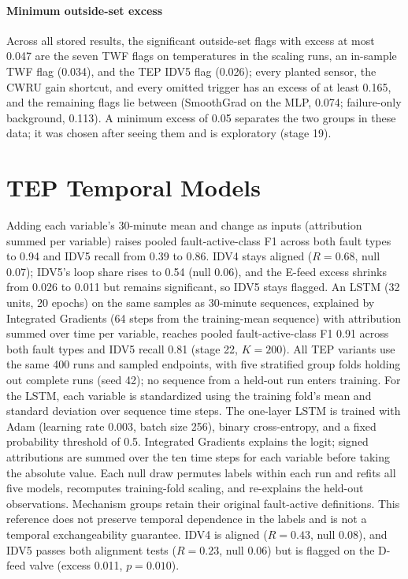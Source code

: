 \documentclass[10pt]{article}
\begin{document}
\paragraph{Minimum outside-set excess} Across all stored results, the significant outside-set flags with excess at most 0.047 are the seven TWF flags on temperatures in the scaling runs, an in-sample TWF flag (0.034), and the TEP IDV5 flag (0.026); every planted sensor, the CWRU gain shortcut, and every omitted trigger has an excess of at least 0.165, and the remaining flags lie between (SmoothGrad on the MLP, 0.074; failure-only background, 0.113). A minimum excess of 0.05 separates the two groups in these data; it was chosen after seeing them and is exploratory (stage 19).

\clearpage
\section{TEP Temporal Models} Adding each variable's 30-minute mean and change as inputs (attribution summed per variable) raises pooled fault-active-class F1 across both fault types to 0.94 and IDV5 recall from 0.39 to 0.86. IDV4 stays aligned ($R=0.68$, null 0.07); IDV5's loop share rises to 0.54 (null 0.06), and the E-feed excess shrinks from 0.026 to 0.011 but remains significant, so IDV5 stays flagged. An LSTM (32 units, 20 epochs) on the same samples as 30-minute sequences, explained by Integrated Gradients (64 steps from the training-mean sequence) with attribution summed over time per variable, reaches pooled fault-active-class F1 0.91 across both fault types and IDV5 recall 0.81 (stage 22, $K=200$). All TEP variants use the same 400 runs and sampled endpoints, with five stratified group folds holding out complete runs (seed 42); no sequence from a held-out run enters training. For the LSTM, each variable is standardized using the training fold's mean and standard deviation over sequence time steps. The one-layer LSTM is trained with Adam (learning rate 0.003, batch size 256), binary cross-entropy, and a fixed probability threshold of 0.5. Integrated Gradients explains the logit; signed attributions are summed over the ten time steps for each variable before taking the absolute value. Each null draw permutes labels within each run and refits all five models, recomputes training-fold scaling, and re-explains the held-out observations. Mechanism groups retain their original fault-active definitions. This reference does not preserve temporal dependence in the labels and is not a temporal exchangeability guarantee. IDV4 is aligned ($R=0.43$, null 0.08), and IDV5 passes both alignment tests ($R=0.23$, null 0.06) but is flagged on the D-feed valve (excess 0.011, $p=0.010$).
\end{document}
